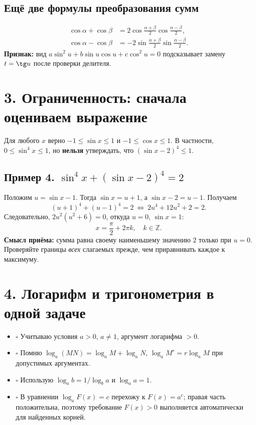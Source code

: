 \documentclass[a4paper,12pt]{article}
\newcommand{\key}[1]{\textcolor{darkaccent}{\textbf{#1}}}
\newcommand{\attention}[1]{\textcolor{warn}{\textbf{#1}}}
\begin{document}
\subsection*{Ещё две формулы преобразования сумм}
\[
\begin{aligned}
\cos\alpha+\cos\beta
 &=2\cos\frac{\alpha+\beta}{2}\cos\frac{\alpha-\beta}{2},\\
\cos\alpha-\cos\beta
 &=-2\sin\frac{\alpha+\beta}{2}\sin\frac{\alpha-\beta}{2}.
\end{aligned}
\]
\key{Признак:} вид $a\sin^2u+b\sin u\cos u+c\cos^2u=0$ подсказывает замену $t=\tg u$ после проверки делителя.
\clearpage

\section*{3. Ограниченность: сначала оцениваем выражение}
Для любого $x$ верно $-1\le\sin x\le1$ и $-1\le\cos x\le1$.
В частности, $0\le\sin^4x\le1$, но \attention{нельзя} утверждать, что $(\sin x-2)^4\le1$.

\subsection*{Пример 4. $\sin^4x+(\sin x-2)^4=2$}
Положим $u=\sin x-1$. Тогда $\sin x=u+1$, а $\sin x-2=u-1$. Получаем
\[
(u+1)^4+(u-1)^4=2
\ \Longleftrightarrow\
2u^4+12u^2+2=2.
\]
Следовательно, $2u^2(u^2+6)=0$, откуда $u=0$, $\sin x=1$:
\[
\boxed{x=\frac\pi2+2\pi k,\quad k\in\mathbb Z.}
\]
\key{Смысл приёма:} сумма равна своему наименьшему значению $2$ только при $u=0$. Проверяйте границы \emph{всех} слагаемых прежде, чем приравнивать каждое к максимуму.

\section*{4. Логарифм и тригонометрия в одной задаче}
\begin{itemize}
\item $\square$ Учитываю условия $a>0$, $a\ne1$, аргумент логарифма $>0$.
\item $\square$ Помню $\log_a(MN)=\log_aM+\log_aN$, $\log_a M^r=r\log_aM$ при допустимых аргументах.
\item $\square$ Использую $\log_a b=1/\log_b a$ и $\log_a a=1$.
\item $\square$ В уравнении $\log_a F(x)=c$ перехожу к $F(x)=a^c$; правая часть положительна, поэтому требование $F(x)>0$ выполняется автоматически для найденных корней.
\end{itemize}
\end{document}
